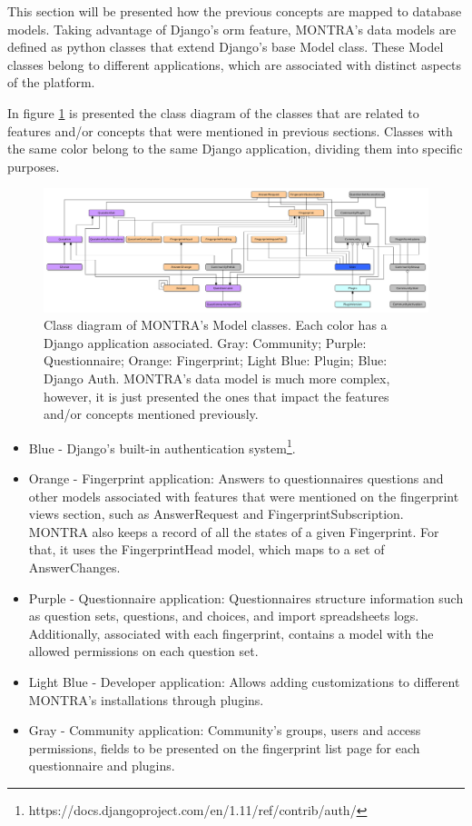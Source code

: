 This section will be presented how the previous concepts are mapped to database models.
Taking advantage of Django's \gls{orm} feature, MONTRA's data models are defined as python classes that extend Django's base Model class.
These Model classes belong to different applications, which are associated with distinct aspects of the platform.

In figure \ref{fig:old-models} is presented the class diagram of the classes that are related to features and/or concepts that were mentioned in previous sections.
Classes with the same color belong to the same Django application, dividing them into specific purposes.

\begin{figure}
    \includegraphics[width=\textwidth]{old-models}
    \caption{Class diagram of MONTRA's Model classes. Each color has a Django application associated. Gray: Community; Purple: Questionnaire; Orange: Fingerprint; Light Blue: Plugin; Blue: Django Auth. MONTRA's data model is much more complex, however, it is just presented the ones that impact the features and/or concepts mentioned previously.}
    \label{fig:old-models}
\end{figure}

\begin{itemize}
    \item Blue - Django's built-in authentication system\footnote{https://docs.djangoproject.com/en/1.11/ref/contrib/auth/}.
    \item Orange - Fingerprint application: Answers to questionnaires questions and other models associated with features that were mentioned on the fingerprint views section, such as AnswerRequest and FingerprintSubscription.
        MONTRA also keeps a record of all the states of a given Fingerprint.
        For that, it uses the FingerprintHead model, which maps to a set of AnswerChanges.
    \item Purple - Questionnaire application: Questionnaires structure information such as question sets, questions, and choices, and import spreadsheets logs. Additionally, associated with each fingerprint, contains a model with the allowed permissions on each question set.
    \item Light Blue - Developer application: Allows adding customizations to different MONTRA's installations through plugins.
    \item Gray - Community application: Community's groups, users and access permissions, fields to be presented on the fingerprint list page for each questionnaire and plugins.
\end{itemize}

